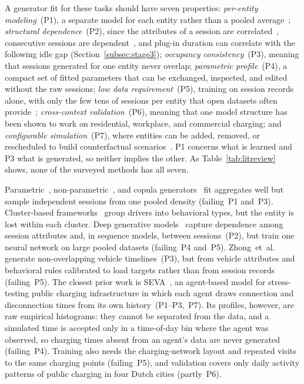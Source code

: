 \documentclass[journal]{IEEEtran}
\begin{document}
A generator fit for these tasks should have seven properties: \emph{per-entity modeling}~(P1), a separate model for each entity rather than a pooled average~\cite{vandermeer2024predictability}; \emph{structural dependence}~(P2), since the attributes of a session are correlated~\cite{einolander2022}, consecutive sessions are dependent~\cite{shepero2018}, and plug-in duration can correlate with the following idle gap (Section~\ref{subsec:stage3}); \emph{occupancy consistency}~(P3), meaning that sessions generated for one entity never overlap; \emph{parametric profile}~(P4), a compact set of fitted parameters that can be exchanged, inspected, and edited without the raw sessions; \emph{low data requirement}~(P5), training on session records alone, with only the few tens of sessions per entity that open datasets often provide~\cite{sorensen2024}; \emph{cross-context validation}~(P6), meaning that one model structure has been shown to work on residential, workplace, and commercial charging; and \emph{configurable simulation}~(P7), where entities can be added, removed, or rescheduled to build counterfactual scenarios~\cite{powell2022}. P1 concerns what is learned and P3 what is generated, so neither implies the other. As Table~\ref{tab:litreview} shows, none of the surveyed methods has all seven.

Parametric~\cite{lahariya2020}, non-parametric~\cite{chen2020modeling}, and copula generators~\cite{einolander2021,einolander2022} fit aggregates well but sample independent sessions from one pooled density (failing~P1 and~P3). Cluster-based frameworks~\cite{powell2022,vankriekinge2023,canigueral2023assessment} group drivers into behavioral types, but the entity is lost within each cluster. Deep generative models~\cite{li2024synthesis,li2025trc,lescrauwaet2026synthcharge} capture dependence among session attributes and, in sequence models, between sessions~(P2), but train one neural network on large pooled datasets (failing~P4 and~P5). Zhong~et~al.~\cite{zhong2026time} generate non-overlapping vehicle timelines~(P3), but from vehicle attributes and behavioral rules calibrated to load targets rather than from session records (failing~P5). The closest prior work is SEVA~\cite{helmus2022validated}, an agent-based model for stress-testing public charging infrastructure in which each agent draws connection and disconnection times from its own history~(P1--P3,~P7). Its profiles, however, are raw empirical histograms: they cannot be separated from the data, and a simulated time is accepted only in a time-of-day bin where the agent was observed, so charging times absent from an agent's data are never generated (failing~P4). Training also needs the charging-network layout and repeated visits to the same charging points (failing~P5), and validation covers only daily activity patterns of public charging in four Dutch cities (partly~P6).
\end{document}

